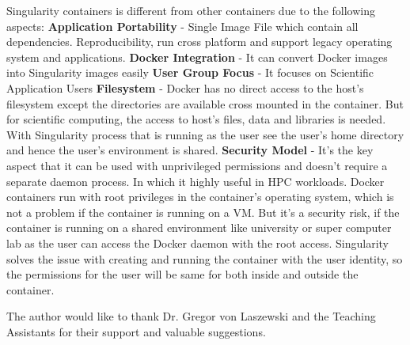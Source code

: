\documentclass[sigconf]{acmart}
\begin{document}
	Singularity containers is different from other containers due to the following aspects:
	\textbf{Application Portability} - Single Image File which contain all dependencies. Reproducibility, run cross platform and support legacy operating system and applications.\newline
	\textbf{Docker Integration} - It can convert Docker images into Singularity images easily \newline
	\textbf{User Group Focus} - It focuses on Scientific Application Users \newline
	\textbf{Filesystem} - Docker has no direct access to the host's filesystem except the directories are available cross mounted in the container. But for scientific computing, the access to host's files, data and libraries is needed. With Singularity process that is running as the user see the user's home directory and hence the user's environment is shared. \newline
	\textbf{Security Model} - It's the key aspect that it can be used with unprivileged permissions and doesn't require a separate daemon process. In which it highly useful in HPC workloads.\newline
	Docker containers run with root privileges in the container's operating system, which is not a problem if the container is running on a VM. But
	it's a security risk, if the container is running on a shared environment like university or super computer lab as the user can access the
	Docker daemon with the root access. Singularity solves the issue with creating and running the container with the user identity, so the permissions for the user will be same for both inside and outside the container.\newline
	\cite{Singularity}
	
	\begin{acks}		
	
	The author would like to thank Dr. Gregor von Laszewski and the Teaching Assistants for their support and valuable suggestions.
	
	\end{acks}
	
	 
	
\end{document}

